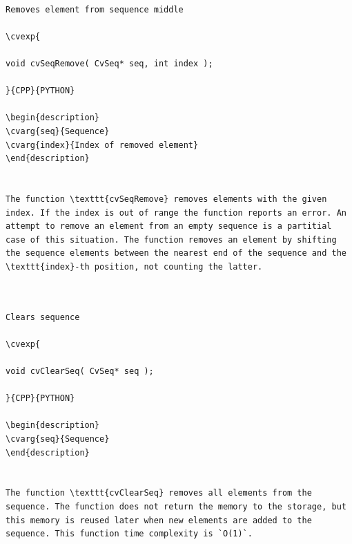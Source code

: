 \begin{verbatim}

Removes element from sequence middle

\cvexp{

void cvSeqRemove( CvSeq* seq, int index );

}{CPP}{PYTHON}

\begin{description}
\cvarg{seq}{Sequence}
\cvarg{index}{Index of removed element}
\end{description}


The function \texttt{cvSeqRemove} removes elements with the given index. If the index is out of range the function reports an error. An attempt to remove an element from an empty sequence is a partitial case of this situation. The function removes an element by shifting the sequence elements between the nearest end of the sequence and the \texttt{index}-th position, not counting the latter.


\end{verbatim}
\label{ClearSeq}
\begin{verbatim}

Clears sequence

\cvexp{

void cvClearSeq( CvSeq* seq );

}{CPP}{PYTHON}

\begin{description}
\cvarg{seq}{Sequence}
\end{description}


The function \texttt{cvClearSeq} removes all elements from the sequence. The function does not return the memory to the storage, but this memory is reused later when new elements are added to the sequence. This function time complexity is `O(1)`.


\end{verbatim}
\label{GetSeqElem}

